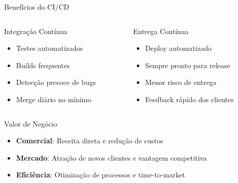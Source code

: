 \documentclass[10pt, aspectratio=169]{beamer}
\begin{document}
\begin{frame}{Benefícios do CI/CD}
\begin{columns}
\begin{column}{0.5\textwidth}
\begin{block}{Integração Contínua}
\begin{itemize}
    \item Testes automatizados
    \item Builds frequentes
    \item Detecção precoce de bugs
    \item Merge diário no mínimo
\end{itemize}
\end{block}
\end{column}
\begin{column}{0.5\textwidth}
\begin{block}{Entrega Contínua}
\begin{itemize}
    \item Deploy automatizado
    \item Sempre pronto para release
    \item Menor risco de entrega
    \item Feedback rápido dos clientes
\end{itemize}
\end{block}
\end{column}
\end{columns}

\vspace{0.5cm}
\begin{exampleblock}{Valor de Negócio}
\begin{itemize}
    \item \textbf{Comercial}: Receita direta e redução de custos
    \item \textbf{Mercado}: Atração de novos clientes e vantagem competitiva
    \item \textbf{Eficiência}: Otimização de processos e time-to-market
\end{itemize}
\end{exampleblock}
\end{frame}
\end{document}
